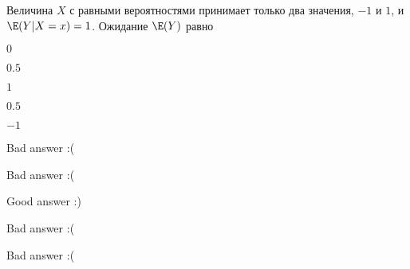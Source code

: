 
\begin{question}
Величина \(X\) с равными вероятностями принимает только два значения,
\(-1\) и \(1\), и \(\E(Y|X=x)=1\). Ожидание \(\E(Y)\) равно
\begin{answerlist}
  \item \(0\)
  \item \(0.5\)
  \item \(1\)
  \item \(0.5\)
  \item \(-1\)
\end{answerlist}
\end{question}

\begin{solution}
\begin{answerlist}
  \item Bad answer :(
  \item Bad answer :(
  \item Good answer :)
  \item Bad answer :(
  \item Bad answer :(
\end{answerlist}
\end{solution}

